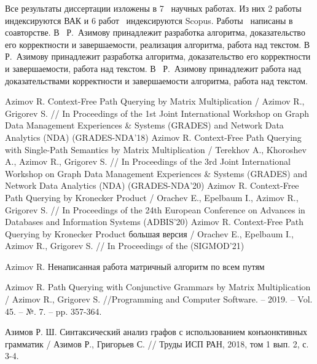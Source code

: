 {\publications} Все результаты диссертации изложены в 7~\cite{1,2,3,4,5,6,7} научных работах. Из них 2 работы~\cite{6,7} индексируются ВАК и 6 работ~\cite{1,2,3,4,5,6} индексируются Scopus. Работы~\cite{1,2,3,4,6,7} написаны в соавторстве. В~\cite{1,6,7} Р.~Азимову принадлежит разработка алгоритма, доказательство его корректности и завершаемости, реализация алгоритма, работа над текстом. В~\cite{2} Р.~Азимову принадлежит разработка алгоритма, доказательство его корректности и завершаемости, работа над текстом. В~\cite{3,4} Р.~Азимову принадлежит работа над доказательствами корректности и завершаемости алгоритма, работа над текстом.


\begin{thebibliography}{99}
	 Azimov R. Context-Free Path Querying by
	Matrix Multiplication / Azimov R., Grigorev S. // In Proceedings of the
	1st Joint International Workshop on Graph Data Management Experiences \&
	Systems (GRADES) and Network Data Analytics (NDA) (GRADES-NDA’18)
	 Azimov R. Context-Free Path Querying with Single-Path Semantics by
	Matrix Multiplication / Terekhov A., Khoroshev A., Azimov R., Grigorev S. // In Proceedings of the
	3rd Joint International Workshop on Graph Data Management Experiences \&
	Systems (GRADES) and Network Data Analytics (NDA) (GRADES-NDA’20)
	 Azimov R. Context-Free Path Querying by Kronecker
	Product / Orachev E., Epelbaum I., Azimov R., Grigorev S. // In Proceedings of the
	24th European Conference on Advances in Databases and Information Systems (ADBIS’20)
	 Azimov R. Context-Free Path Querying by Kronecker
	Product большая версия / Orachev E., Epelbaum I., Azimov R., Grigorev S. // In Proceedings of the (SIGMOD’21)
	
	 Azimov R. Ненаписанная работа матричный алгоритм по всем путям
	
	 Azimov R. Path Querying with Conjunctive Grammars by Matrix Multiplication / Azimov R., Grigorev S. //Programming and Computer Software. – 2019. – Vol. 45. – №. 7. – pp. 357-364.
	\setcounter{firstbib}{\value{enumiv}}
	
	 Азимов Р. Ш. Синтаксический анализ графов с использованием конъюнктивных грамматик / Азимов Р., Григорьев С. // Труды ИСП РАН, 2018, том 1 вып. 2, с. 3-4.
	
\end{thebibliography}